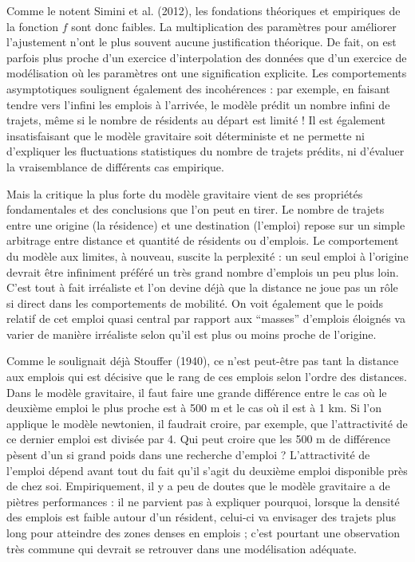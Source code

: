 \documentclass[
  10pt,
  a4paper,
  numbers=noendperiod,
  DIV=12]{scrartcl}
\begin{document}
Comme le notent Simini et al. (2012), les fondations théoriques et
empiriques de la fonction \(f\) sont donc faibles. La multiplication des
paramètres pour améliorer l'ajustement n'ont le plus souvent aucune
justification théorique. De fait, on est parfois plus proche d'un
exercice d'interpolation des données que d'un exercice de modélisation
où les paramètres ont une signification explicite. Les comportements
asymptotiques soulignent également des incohérences : par exemple, en
faisant tendre vers l'infini les emplois à l'arrivée, le modèle prédit
un nombre infini de trajets, même si le nombre de résidents au départ
est limité ! Il est également insatisfaisant que le modèle gravitaire
soit déterministe et ne permette ni d'expliquer les fluctuations
statistiques du nombre de trajets prédits, ni d'évaluer la vraisemblance
de différents cas empirique.

Mais la critique la plus forte du modèle gravitaire vient de ses
propriétés fondamentales et des conclusions que l'on peut en tirer. Le
nombre de trajets entre une origine (la résidence) et une destination
(l'emploi) repose sur un simple arbitrage entre distance et quantité de
résidents ou d'emplois. Le comportement du modèle aux limites, à
nouveau, suscite la perplexité : un seul emploi à l'origine devrait être
infiniment préféré un très grand nombre d'emplois un peu plus loin.
C'est tout à fait irréaliste et l'on devine déjà que la distance ne joue
pas un rôle si direct dans les comportements de mobilité. On voit
également que le poids relatif de cet emploi quasi central par rapport
aux ``masses'' d'emplois éloignés va varier de manière irréaliste selon
qu'il est plus ou moins proche de l'origine.

Comme le soulignait déjà Stouffer (1940), ce n'est peut-être pas tant la
distance aux emplois qui est décisive que le rang de ces emplois selon
l'ordre des distances. Dans le modèle gravitaire, il faut faire une
grande différence entre le cas où le deuxième emploi le plus proche est
à 500 m et le cas où il est à 1 km. Si l'on applique le modèle
newtonien, il faudrait croire, par exemple, que l'attractivité de ce
dernier emploi est divisée par 4. Qui peut croire que les 500 m de
différence pèsent d'un si grand poids dans une recherche d'emploi ?
L'attractivité de l'emploi dépend avant tout du fait qu'il s'agit du
deuxième emploi disponible près de chez soi. Empiriquement, il y a peu
de doutes que le modèle gravitaire a de piètres performances : il ne
parvient pas à expliquer pourquoi, lorsque la densité des emplois est
faible autour d'un résident, celui-ci va envisager des trajets plus long
pour atteindre des zones denses en emplois ; c'est pourtant une
observation très commune qui devrait se retrouver dans une modélisation
adéquate.
\end{document}
